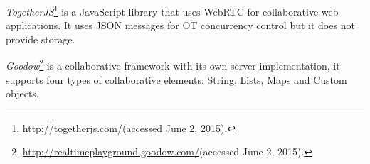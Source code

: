 	\emph{TogetherJS}\footnote{\url{http://togetherjs.com/}(accessed June 2, 2015).} is a JavaScript library that uses \ac{WebRTC} for collaborative web applications. It uses \ac{JSON} messages for \ac{OT} concurrency control but it does not provide storage.

	\emph{Goodow}\footnote{\url{http://realtimeplayground.goodow.com/}(accessed June 2, 2015).} is a collaborative framework with its own server implementation, it supports four types of collaborative elements: String, Lists, Maps and Custom objects.
	

